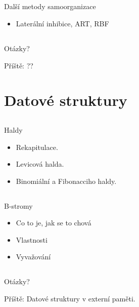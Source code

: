 \documentclass{beamer}
\begin{document}
\subsection{}
\begin{frame}{Další metody samoorganizace}
\begin{itemize}
\item Laterální inhibice, ART, RBF
\end{itemize}
\end{frame}

\subsection{}
\begin{frame}{Otázky?}
\begin{center}
Příště: ??
\end{center}
\end{frame}

\section{Datové struktury}

\subsection{}
\begin{frame}{Haldy}
\begin{itemize}
\item Rekapitulace.
\item Levicová halda.
\item Binomiální a Fibonacciho haldy.
\end{itemize}
\end{frame}

\subsection{}
\begin{frame}{B-stromy}
\begin{itemize}
\item Co to je, jak se to chová
\item Vlastnosti
\item Vyvažování
\end{itemize}
\end{frame}

\subsection{}
\begin{frame}{Otázky?}
\begin{center}
Příště: Datové struktury v externí paměti.
\end{center}
\end{frame}

\subsection{}
\end{document}

